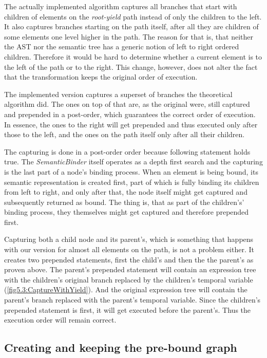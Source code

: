 The actually implemented algorithm captures all branches that start with children of elements on the \emph{root-yield} path instead of only the children to the left. It also captures branches starting on the path itself, after all they are children of some elements one level higher in the path. The reason for that is, that neither the AST nor the semantic tree has a generic notion of left to right ordered children. Therefore it would be hard to determine whether a current element is to the left of the path or to the right. This change, however, does not alter the fact that the transformation keeps the original order of execution.

The implemented version captures a superset of branches the theoretical algorithm did. The ones on top of that are, as the original were, still captured and prepended in a post-order, which guarantees the correct order of execution. In essence, the ones to the right will get prepended and thus executed only after those to the left, and the ones on the path itself only after all their children.

The capturing is done in a post-order order because following statement holds true. The \emph{SemanticBinder} itself operates as a depth first search and the capturing is the last part of a node’s binding process. When an element is being bound, its semantic representation is created first, part of which is fully binding its children from left to right, and only after that, the node itself might get captured and subsequently returned as bound. The thing is, that as part of the children's’ binding process, they themselves might get captured and therefore prepended first. 

Capturing both a child node and its parent’s, which is something that happens with our version for almost all elements on the path, is not a problem either. It creates two prepended statements, first the child’s and then the the parent’s as proven above. The parent’s prepended statement will contain an expression tree with the children’s original branch replaced by the children’s temporal variable (\autoref{fig5.3:CaptureWithYield}). And the original expression tree will contain the parent’s branch replaced with the parent’s temporal variable. Since the children’s prepended statement is first, it will get executed before the parent’s. Thus the execution order will remain correct.

\subsection{Creating and keeping the pre-bound graph}

